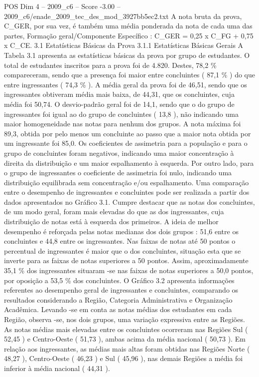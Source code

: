 \begin{textsample}{POS Dim 4 – 2009\_c6 – Score -3.00 – 2009\_c6/enade\_2009\_tec\_des\_mod\_3927bb5ec2.txt}
A nota bruta da prova, C\_GER, por sua vez, é também uma média ponderada da nota de cada uma das partes, Formação geral/Componente Específico : C\_GER = 0,25 x C\_FG + 0,75 x C\_CE. 3.1 Estatísticas Básicas da Prova 3.1.1 Estatísticas Básicas Gerais A Tabela 3.1 apresenta as estatísticas básicas da prova por grupo de estudantes.
O total de estudantes inscritos para a prova foi de 4.820.
Destes, 78,2 \% compareceram, sendo que a presença foi maior entre concluintes ( 87,1 \% ) do que entre ingressantes ( 74,3 \% ).
A média geral da prova foi de 46,51, sendo que os ingressantes obtiveram média mais baixa, de 44,31, que os concluintes, cuja média foi 50,74.
O desvio-padrão geral foi de 14,1, sendo que o do grupo de ingressantes foi igual ao do grupo de concluintes ( 13,8 ), não indicando uma maior homogeneidade nas notas para nenhum dos grupos.
A nota máxima foi 89,3, obtida por pelo menos um concluinte ao passo que a maior nota obtida por um ingressante foi 85,0.
Os coeficientes de assimetria para a população e para o grupo de concluintes foram negativos, indicando uma maior concentração à direita da distribuição e um maior espalhamento à esquerda.
Por outro lado, para o grupo de ingressantes o coeficiente de assimetria foi nulo, indicando uma distribuição equilibrada sem concentração e/ou espalhamento.
Uma comparação entre o desempenho de ingressantes e concluintes pode ser realizada a partir dos dados apresentados no Gráfico 3.1.
Cumpre destacar que as notas dos concluintes, de um modo geral, foram mais elevadas do que as dos ingressantes, cuja distribuição de notas está à esquerda dos primeiros.
A ideia de melhor desempenho é reforçada pelas notas medianas dos dois grupos : 51,6 entre os concluintes e 44,8 entre os ingressantes.
Nas faixas de notas até 50 pontos o percentual de ingressantes é maior que o dos concluintes, situação esta que se inverte para as faixas de notas superiores a 50 pontos.
Assim, aproximadamente 35,1 \% dos ingressantes situaram -se nas faixas de notas superiores a 50,0 pontos, por oposição a 53,5 \% dos concluintes.
O Gráfico 3.2 apresenta informações referentes ao desempenho geral de ingressantes e concluintes, comparando os resultados considerando a Região, Categoria Administrativa e Organização Acadêmica.
Levando -se em conta as notas médias dos estudantes em cada Região, observa -se, nos dois grupos, uma variação expressiva entre as Regiões.
As notas médias mais elevadas entre os concluintes ocorreram nas Regiões Sul ( 52,45 ) e Centro-Oeste ( 51,73 ), ambas acima da média nacional ( 50,73 ).
Em relação aos ingressantes, as médias mais altas foram obtidas nas Regiões Norte ( 48,27 ), Centro-Oeste ( 46,23 ) e Sul ( 45,96 ), nas demais Regiões a média foi inferior à média nacional ( 44,31 ).

\end{textsample}
